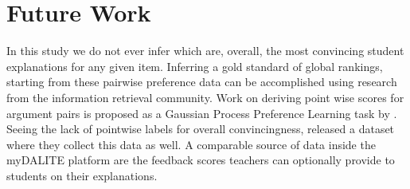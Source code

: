 \documentclass[runningheads]{llncs}
\begin{document}
\section{Future Work}
In this study we do not ever infer which are, overall, the most convincing 
student explanations for any given item. Inferring a gold standard of global 
rankings, starting from these pairwise preference data can be accomplished 
using research from the information retrieval 
community\cite{chen_pairwise_2013}. Work on deriving point wise scores for 
argument pairs is proposed as a Gaussian Process Preference Learning task by 
\cite{simpson_finding_2018}. Seeing the lack of pointwise labels for overall 
convincingness, \cite{toledo_automatic_2019} released a dataset where they 
collect this data as well. A comparable source of data inside the myDALITE 
platform are the feedback scores teachers can optionally provide to students on 
their explanations.


 
 
\end{document}
